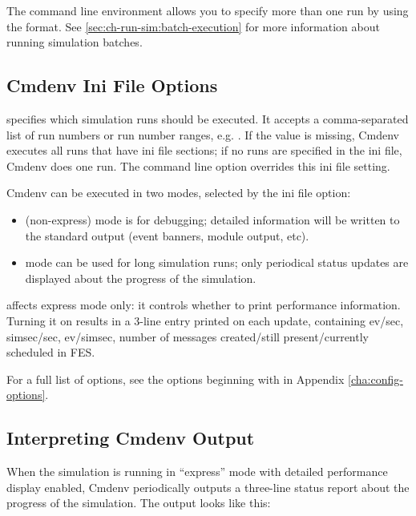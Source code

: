 The command line environment allows you to specify more than one run by
using the  format. See \ref{sec:ch-run-sim:batch-execution}
for more information about running simulation batches.

\subsection{Cmdenv Ini File Options}
\label{sec:ch-run-sim:cmdenv-section}

 specifies which simulation runs should be executed.
It accepts a comma-separated list of run numbers or run number ranges, e.g.
. If the value is missing, Cmdenv executes all runs that have
ini file sections; if no runs are specified in the ini file, Cmdenv does one run.
The  command line option overrides this ini file setting.


Cmdenv can be executed in two modes, selected by the 
ini file option:

\begin{itemize}
    \item {} (non-express) mode is for debugging; detailed information
        will be written to the standard output (event banners, module output,
        etc).
    \item {} mode can be used for long simulation runs; only
        periodical status updates are displayed about the progress of the
        simulation.
\end{itemize}

 affects express mode only: it controls
whether to print performance information. Turning it on results in a 3-line
entry printed on each update, containing ev/sec, simsec/sec, ev/simsec,
number of messages created/still present/currently scheduled in FES.

For a full list of options, see the options beginning with  in
Appendix \ref{cha:config-options}.


\subsection{Interpreting Cmdenv Output}
\label{sec:ch-run-sim:interpreting-cmdenv-output}

When the simulation is running in ``express'' mode with detailed
performance display enabled, Cmdenv periodically outputs a three-line
status report about the progress of the simulation.
The output looks like this:

